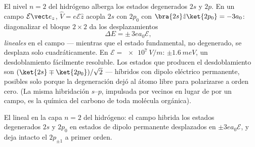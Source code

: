 \begin{example}\label{ex:b3:perturbation-theory:stark}
El nivel $n = 2$ del hidrógeno alberga los estados degenerados $2s$ y $2p$.
En un campo $\mathcal E\vect e_z$, $\hat V = e\mathcal E\hat z$
acopla $2s$ con $2p_0$ con $\bra{2s}\hat z\ket{2p_0} = -3a_0$:
diagonalizar el bloque $2\times2$ da los desplazamientos
\[
\Delta E = \pm\,3e a_0\mathcal E ,
\]
\emph{lineales} en el campo --- mientras que el estado fundamental, no
degenerado, se desplaza solo cuadráticamente. En $\mathcal E = \qty{e7}{V/m}$: $\pm
\qty{1.6}{meV}$, un desdoblamiento fácilmente resoluble. Los estados que
producen el desdoblamiento son $(\ket{2s} \mp \ket{2p_0})/\sqrt2$ ---
híbridos con dipolo eléctrico permanente, posibles solo porque la
degeneración dejó al átomo libre para polarizarse a orden cero. (La misma
hibridación $s$--$p$, impulsada por vecinos en lugar de por un campo, es la
química del carbono de toda molécula orgánica).
\end{example}

\begin{omfigure}

{\small El  lineal en la capa $n = 2$ del hidrógeno: el
campo hibrida los estados degenerados $2s$ y $2p_0$ en estados de dipolo
permanente desplazados en $\pm3ea_0\mathcal E$, y deja intacto el
$2p_{\pm1}$ a primer orden.}
\end{omfigure}

